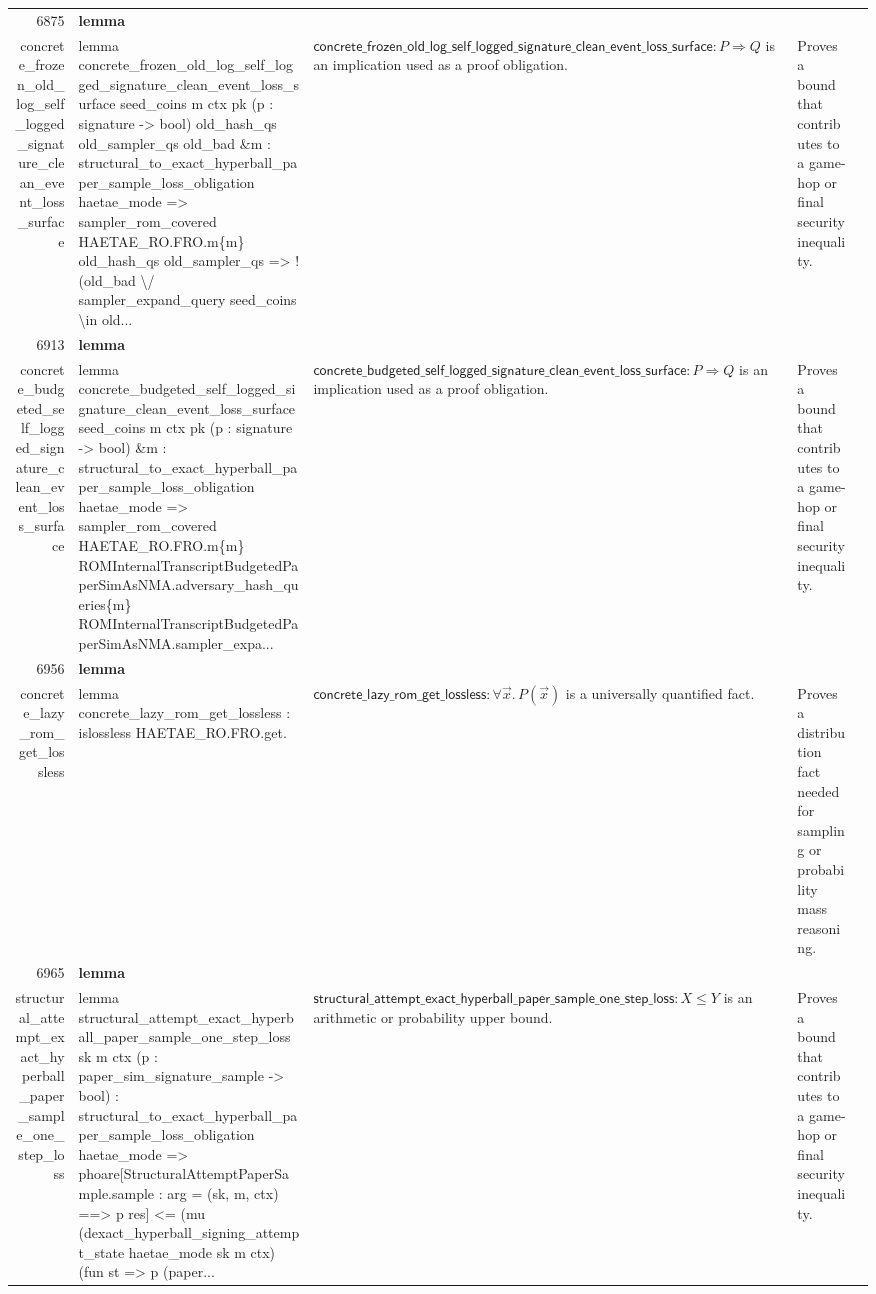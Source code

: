 \documentclass[10pt]{article}
\newcommand{\ec}[1]{\begingroup\ttfamily\scriptsize #1\endgroup}
\begin{document}
\begin{longtable}{r L{0.17\textwidth} L{0.26\textwidth} L{0.27\textwidth} L{0.20\textwidth}}
6875 & \textbf{lemma}\\\ec{concrete\_frozen\_old\_log\_self\_logged\_signature\_clean\_event\_loss\_surface} & \ec{lemma concrete\_frozen\_old\_log\_self\_logged\_signature\_clean\_event\_loss\_surface seed\_coins m ctx pk (p : signature -> bool) old\_hash\_qs old\_sampler\_qs old\_bad \&m : structural\_to\_exact\_hyperball\_paper\_sample\_loss\_obligation haetae\_mode => sampler\_rom\_covered HAETAE\_RO.FRO.m\{m\} old\_hash\_qs old\_sampler\_qs => ! (old\_bad \textbackslash{}/ sampler\_expand\_query seed\_coins \textbackslash{}in old...} & \(\mathsf{concrete\_frozen\_old\_log\_self\_logged\_signature\_clean\_event\_loss\_surface} : P \Rightarrow Q\) is an implication used as a proof obligation. & Proves a bound that contributes to a game-hop or final security inequality. \\
6913 & \textbf{lemma}\\\ec{concrete\_budgeted\_self\_logged\_signature\_clean\_event\_loss\_surface} & \ec{lemma concrete\_budgeted\_self\_logged\_signature\_clean\_event\_loss\_surface seed\_coins m ctx pk (p : signature -> bool) \&m : structural\_to\_exact\_hyperball\_paper\_sample\_loss\_obligation haetae\_mode => sampler\_rom\_covered HAETAE\_RO.FRO.m\{m\} ROMInternalTranscriptBudgetedPaperSimAsNMA.adversary\_hash\_queries\{m\} ROMInternalTranscriptBudgetedPaperSimAsNMA.sampler\_expa...} & \(\mathsf{concrete\_budgeted\_self\_logged\_signature\_clean\_event\_loss\_surface} : P \Rightarrow Q\) is an implication used as a proof obligation. & Proves a bound that contributes to a game-hop or final security inequality. \\
6956 & \textbf{lemma}\\\ec{concrete\_lazy\_rom\_get\_lossless} & \ec{lemma concrete\_lazy\_rom\_get\_lossless : islossless HAETAE\_RO.FRO.get.} & \(\mathsf{concrete\_lazy\_rom\_get\_lossless} : \forall \vec{x}.\, P(\vec{x})\) is a universally quantified fact. & Proves a distribution fact needed for sampling or probability mass reasoning. \\
6965 & \textbf{lemma}\\\ec{structural\_attempt\_exact\_hyperball\_paper\_sample\_one\_step\_loss} & \ec{lemma structural\_attempt\_exact\_hyperball\_paper\_sample\_one\_step\_loss sk m ctx (p : paper\_sim\_signature\_sample -> bool) : structural\_to\_exact\_hyperball\_paper\_sample\_loss\_obligation haetae\_mode => phoare[StructuralAttemptPaperSample.sample : arg = (sk, m, ctx) ==> p res] <= (mu (dexact\_hyperball\_signing\_attempt\_state haetae\_mode sk m ctx) (fun st => p (paper...} & \(\mathsf{structural\_attempt\_exact\_hyperball\_paper\_sample\_one\_step\_loss} : X \le Y\) is an arithmetic or probability upper bound. & Proves a bound that contributes to a game-hop or final security inequality. \\

\end{longtable}
\end{document}
